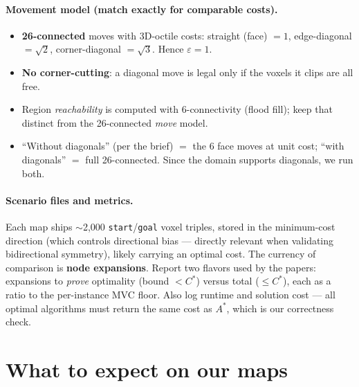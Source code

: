 \documentclass[11pt]{article}
\newcommand{\Cstar}{C^{*}}
\begin{document}
\paragraph{Movement model (match exactly for comparable costs).}
\begin{itemize}[leftmargin=1.4em,itemsep=1pt]
  \item \textbf{26-connected} moves with 3D-octile costs: straight (face) $=1$,
        edge-diagonal $=\sqrt2$, corner-diagonal $=\sqrt3$. Hence $\varepsilon=1$.
  \item \textbf{No corner-cutting}: a diagonal move is legal only if the voxels it clips are
        all free.
  \item Region \emph{reachability} is computed with 6-connectivity (flood fill); keep that
        distinct from the 26-connected \emph{move} model.
  \item ``Without diagonals'' (per the brief) $=$ the 6 face moves at unit cost; ``with
        diagonals'' $=$ full 26-connected. Since the domain supports diagonals, we run both.
\end{itemize}

\paragraph{Scenario files and metrics.} Each map ships $\sim$2{,}000 \texttt{start}/\texttt{goal}
voxel triples, stored in the minimum-cost direction (which controls directional bias ---
directly relevant when validating bidirectional symmetry), likely carrying an optimal cost.
The currency of comparison is \textbf{node expansions}. Report two flavors used by the
papers: expansions to \emph{prove} optimality (bound $<\Cstar$) versus total ($\le\Cstar$),
each as a ratio to the per-instance MVC floor. Also log runtime and solution cost --- all
optimal algorithms must return the same cost as $A^{*}$, which is our correctness check.

\section{What to expect on our maps}
\label{sec:expect}
\end{document}
